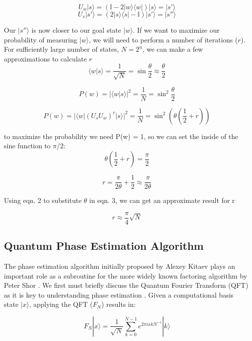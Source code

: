 \documentclass[twocolumn,showpacs,preprintnumbers,amsmath,amssymb]{revtex4}
\begin{document}
		$$ U_w|s \rangle	=  (\mathbb {I} - 2|w \rangle \langle w|) |s \rangle = |s'\rangle$$
		$$ U_s|s' \rangle	=  (2|s \rangle \langle s| - \mathbb {I}) |s' \rangle = |s''\rangle$$
		
		Our $|s''\rangle$ is now closer to our goal state $|w\rangle$.  If we want to maximize our probability of measuring  $|w\rangle$, we will need to perform a number of iterations ($r$). For sufficiently large number of states, $N = 2^n$, we can make a few approximations to calculate $r$
		\begin{equation}
			\langle w | s \rangle = \frac{1}{\sqrt{N}} = \sin \frac{\theta}{2} \approx \frac{\theta}{2}
		\end{equation}
		
		
		$$P(w) = |\langle w | s \rangle|^2 = \frac{1}{N} = \sin^2 \frac{\theta}{2} $$
		
		$$P(w) = |\langle w |(U_sU_w)^r |s \rangle|^2 = \frac{1}{N} = \sin^2 (\theta(\frac{1}{2} + r)) $$
		
		to maximize the probability we need P(w) = 1, so we can set the inside of the sine function to $\pi/2$:
		$$ \theta \left(\frac{1}{2} + r \right) = \frac{\pi}{2}$$
		
		\begin{equation}
			r = \frac{\pi}{2\theta} + \frac{1}{2} \approx \frac{\pi}{2\theta}
		\end{equation}
		
		Using eqn. 2 to substitute $\theta$ in eqn. 3, we can get an approximate result for r
		
		\begin{equation}
			r \approx \frac{\pi}{4}\sqrt{N}
		\end{equation}
		
		
		\subsection{Quantum Phase Estimation Algorithm}
		
		The phase estimation algorithm initially proposed by Alexey Kitaev \cite{kitaev1995quantum} plays an important role as a subroutine for the more widely known factoring algorithm by Peter Shor \cite{Shor}. We first must briefly discuss the Quantum Fourier Transform (QFT) as it is key to understanding phase estimation \cite{nielsen00}. Given a computational basis state $|x\rangle$, applying the QFT ($F_N$) results in:
		
		$$ F_N |x \rangle = \frac{1}{\sqrt{N}} \sum_{k=0}^{N-1} e^{2\pi i x k N^{-1}} |k\rangle $$
		
\end{document}
